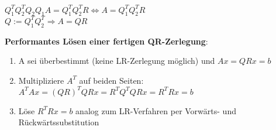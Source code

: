 \documentclass[10pt,a4paper]{article}
\begin{document}
\begin{center}
		$Q_1^TQ_2^TQ_2Q_1A = Q_1^TQ_2^TR \Leftrightarrow A = Q_1^TQ_2^TR$\\
		$Q := Q_1^TQ_2^T \Rightarrow A = QR$
	\end{center}
	\textbf{Performantes Lösen einer fertigen QR-Zerlegung}:
	\begin{enumerate}
		\item A sei überbestimmt (keine LR-Zerlegung möglich) und $Ax = QRx = b$
		\item Multipliziere $A^T$ auf beiden Seiten: $A^TAx = (QR)^TQRx = R^TQ^TQRx = R^TRx = b$
		\item Löse $R^TRx = b$ analog zum LR-Verfahren per Vorwärts- und Rückwärtssubstitution
	\end{enumerate}
\end{document}
